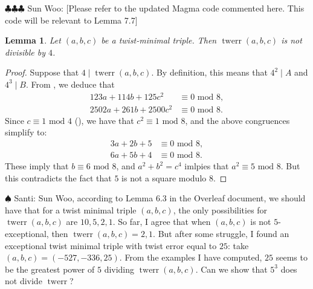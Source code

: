 \documentclass[12pt]{amsart}
\newcounter{counter}[section] %
\numberwithin{equation}{section} %
\newtheorem{lemma}[counter]{Lemma}
\theoremstyle{definition} \newtheorem{definition}[counter]{Definition}
\theoremstyle{remark} \newtheorem{nonexam}[counter]{Non-example}
\newcommand{\md}{\text{ mod }} %
\newcommand{\santi}[1]{{\color{cyan} \sf
    $\spadesuit$ Santi: #1}}
\newcommand{\spark}[1]{{\color{olive} \sf
    $\clubsuit\clubsuit\clubsuit$ Sun Woo: [#1]}}
\DeclareMathOperator{\twerr}{twerr} %
\begin{document}
\spark{Please refer to the updated Magma code commented here. This code will be relevant to Lemma 7.7}


\begin{lemma}
  \label{lemma:4-nmid-twerr}
  Let $(a,b,c)$ be a twist-minimal triple. Then
  $\twerr(a,b,c)$ is not divisible by $4$.
\end{lemma}
\begin{proof}
  Suppose that $4 \mid \twerr(a,b,c)$. By definition, this means that $4^2 \mid
  A$ and $4^3 \mid B$. From , we deduce that
  \begin{align*}
    123a + 114b + 125c^2 &\equiv 0 \md 8, \\
    2502a + 261b + 2500c^2 &\equiv 0 \md 8.
  \end{align*}
  Since $c \equiv 1 \md 4$ (), we have that
  $c^2 \equiv 1 \md 8$, and the above congruences simplify to:
    \begin{align*}
    3a + 2b + 5 &\equiv 0 \md 8, \\
    6a + 5b + 4 &\equiv 0 \md 8.
    \end{align*}
    These imply that $b \equiv 6 \md 8$, and $a^2 + b^2 = c^4$ imlpies that
    $a^2 \equiv 5 \md 8$. But this contradicts the fact that $5$ is not a
    square modulo $8$.
  \end{proof}

  \santi{Sun Woo, according to Lemma 6.3 in the Overleaf document, we should
    have that for a twist minimal triple $(a,b,c)$, the only possibilities for
    $\twerr(a,b,c)$ are $10, 5, 2, 1$. So far, I agree that when $(a,b,c)$ is
    not $5$-exceptional, then $\twerr(a,b,c) = 2, 1$. But after some struggle,
    I found an exceptional twist minimal triple with twist error equal to $25$:
    take $(a,b,c) = (-527, -336, 25)$. From the examples I have computed, $25$
    seems to be the greatest power of $5$ dividing $\twerr(a,b,c)$. Can we show
    that $5^3$ does not divide $\twerr$?}
\end{document}
